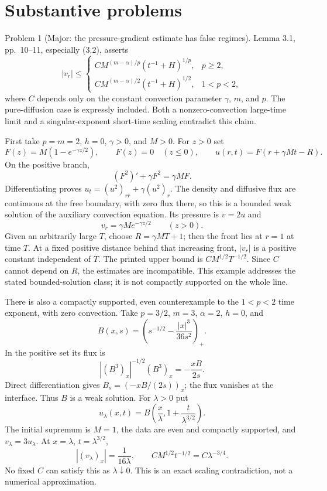 \documentclass[10pt]{article}
\begin{document}
\section*{Substantive problems}
Problem 1 (Major: the pressure-gradient estimate has false regimes).  Lemma 3.1, pp. 10–11, especially (3.2), asserts \[|v_r|\leq
 \begin{cases}
 C M^{(m-\alpha)/p}(t^{-1}+H)^{1/p},&p\geq2,\\
 C M^{(m-\alpha)/2}(t^{-1}+H)^{1/2},&1<p<2,
 \end{cases}\] where \(C\) depends only on the constant convection parameter \(\gamma\), \(m\), and \(p\). The pure-diffusion case is expressly included. Both a nonzero-convection large-time limit and a singular-exponent short-time scaling contradict this claim.\par
First take \(p=m=2\), \(h=0\), \(\gamma>0\), and \(M>0\). For \(z>0\) set \[F(z)=M(1-e^{-\gamma z/2}),\qquad F(z)=0\quad(z\leq0),
 \qquad u(r,t)=F(r+\gamma Mt-R).\] On the positive branch, \[(F^2)'+\gamma F^2=\gamma MF.\] Differentiating proves \(u_t=(u^2)_{rr}+\gamma(u^2)_r\). The density and diffusive flux are continuous at the free boundary, with zero flux there, so this is a bounded weak solution of the auxiliary convection equation. Its pressure is \(v=2u\) and \[v_r=\gamma M e^{-\gamma z/2}\qquad(z>0).\] Given an arbitrarily large \(T\), choose \(R=\gamma MT+1\); then the front lies at \(r=1\) at time \(T\). At a fixed positive distance behind that increasing front, \(|v_r|\) is a positive constant independent of \(T\). The printed upper bound is \(CM^{1/2}T^{-1/2}\). Since \(C\) cannot depend on \(R\), the estimates are incompatible. This example addresses the stated bounded-solution class; it is not compactly supported on the whole line.\par
There is also a compactly supported, even counterexample to the \(1<p<2\) time exponent, with zero convection. Take \(p=3/2\), \(m=3\), \(\alpha=2\), \(h=0\), and \[B(x,s)=\left(s^{-1/2}-\frac{|x|^3}{36s^2}\right)_+ .\] In the positive set its flux is \[|(B^3)_x|^{-1/2}(B^3)_x=-\frac{xB}{2s}.\] Direct differentiation gives \(B_s=(-xB/(2s))_x\); the flux vanishes at the interface. Thus \(B\) is a weak solution. For \(\lambda>0\) put \[u_\lambda(x,t)=B\left(\frac{x}{\lambda},
                 1+\frac{t}{\lambda^{3/2}}\right).\] The initial supremum is \(M=1\), the data are even and compactly supported, and \(v_\lambda=3u_\lambda\). At \(x=\lambda\), \(t=\lambda^{3/2}\), \[|(v_\lambda)_x|=\frac{1}{16\lambda},
 \qquad
 CM^{1/2}t^{-1/2}=C\lambda^{-3/4}.\] No fixed \(C\) can satisfy this as \(\lambda\downarrow0\). This is an exact scaling contradiction, not a numerical approximation.\par
\end{document}
